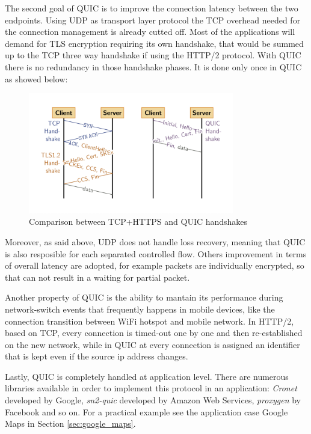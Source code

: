		\par The second goal of QUIC is to improve the connection latency between the two endpoints. Using UDP as transport layer protocol the TCP overhead needed for the connection management is already cutted off. Most of the applications will demand for TLS encryption requiring its own handshake, that would be summed up to the TCP three way handshake if using the HTTP/2 protocol. With QUIC there is no redundancy in those handshake phases. It is done only once in QUIC as showed below:
		\newline
		\begin{figure}[ht]
			\centering
			\includegraphics[width=0.8\textwidth]{images/quic_handshake.png}
			\caption{Comparison between TCP+HTTPS and QUIC handshakes}
		\end{figure}	
		\par Moreover, as said above, UDP does not handle loss recovery, meaning that QUIC is also resposible for each separated controlled flow. Others improvement in terms of overall latency are adopted, for example packets are individually encrypted, so that can not result in a waiting for partial packet.\newline
		\par Another property of QUIC is the ability to mantain its performance during network-switch events that frequently happens in mobile devices, like the connection transition between WiFi hotspot and mobile network. In HTTP/2, based on TCP, every connection is timed-out one by one and then re-established on the new network, while in QUIC at every connection is assigned an identifier that is kept even if the source ip address changes.
		\par Lastly, QUIC is completely handled at application level. There are numerous libraries available in order to implement this protocol in an application: \textit{Cronet} developed by Google, \textit{sn2-quic} developed by Amazon Web Services, \textit{proxygen} by Facebook and so on.\newline
		For a practical example see the application case Google Maps in Section \ref{sec:google_maps}.
	
